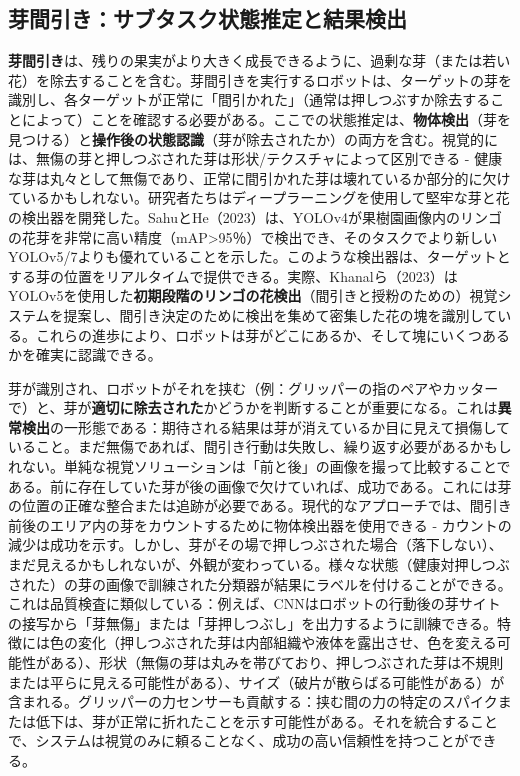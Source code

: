 \documentclass[a4paper,fleqn,10pt,twocolumn]{template_v1.0}
\begin{document}
\subsection{芽間引き：サブタスク状態推定と結果検出}
\textbf{芽間引き}は、残りの果実がより大きく成長できるように、過剰な芽（または若い花）を除去することを含む。芽間引きを実行するロボットは、ターゲットの芽を識別し、各ターゲットが正常に「間引かれた」（通常は押しつぶすか除去することによって）ことを確認する必要がある。ここでの状態推定は、\textbf{物体検出}（芽を見つける）と\textbf{操作後の状態認識}（芽が除去されたか）の両方を含む。視覚的には、無傷の芽と押しつぶされた芽は形状/テクスチャによって区別できる - 健康な芽は丸々として無傷であり、正常に間引かれた芽は壊れているか部分的に欠けているかもしれない。研究者たちはディープラーニングを使用して堅牢な芽と花の検出器を開発した。SahuとHe（2023）は、YOLOv4が果樹園画像内のリンゴの花芽を非常に高い精度（mAP>95％）で検出でき、そのタスクでより新しいYOLOv5/7よりも優れていることを示した\cite{Sahu2023}。このような検出器は、ターゲットとする芽の位置をリアルタイムで提供できる。実際、Khanalら（2023）はYOLOv5を使用した\textbf{初期段階のリンゴの花検出}（間引きと授粉のための）視覚システムを提案し、間引き決定のために検出を集めて密集した花の塊を識別している\cite{Khanal2023}。これらの進歩により、ロボットは芽がどこにあるか、そして塊にいくつあるかを確実に認識できる。

芽が識別され、ロボットがそれを挟む（例：グリッパーの指のペアやカッターで）と、芽が\textbf{適切に除去された}かどうかを判断することが重要になる。これは\textbf{異常検出}の一形態である：期待される結果は芽が消えているか目に見えて損傷していること。まだ無傷であれば、間引き行動は失敗し、繰り返す必要があるかもしれない。単純な視覚ソリューションは「前と後」の画像を撮って比較することである。前に存在していた芽が後の画像で欠けていれば、成功である。これには芽の位置の正確な整合または追跡が必要である。現代的なアプローチでは、間引き前後のエリア内の芽をカウントするために物体検出器を使用できる - カウントの減少は成功を示す。しかし、芽がその場で押しつぶされた場合（落下しない）、まだ見えるかもしれないが、外観が変わっている。様々な状態（健康対押しつぶされた）の芽の画像で訓練された分類器が結果にラベルを付けることができる。これは品質検査に類似している：例えば、CNNはロボットの行動後の芽サイトの接写から「芽無傷」または「芽押しつぶし」を出力するように訓練できる。特徴には色の変化（押しつぶされた芽は内部組織や液体を露出させ、色を変える可能性がある）、形状（無傷の芽は丸みを帯びており、押しつぶされた芽は不規則または平らに見える可能性がある）、サイズ（破片が散らばる可能性がある）が含まれる。グリッパーの力センサーも貢献する：挟む間の力の特定のスパイクまたは低下は、芽が正常に折れたことを示す可能性がある。それを統合することで、システムは視覚のみに頼ることなく、成功の高い信頼性を持つことができる。
\end{document}
